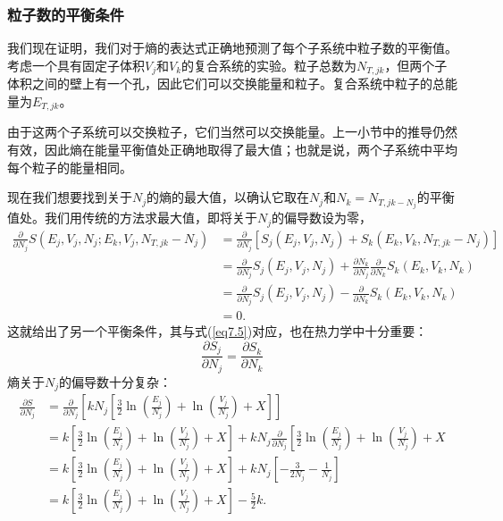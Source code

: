 \documentclass[UTF8]{ctexart}
\numberwithin{equation}{section}%
\numberwithin{figure}{section}%
\begin{document}
    \subsubsection{粒子数的平衡条件}

    我们现在证明，我们对于熵的表达式正确地预测了每个子系统中粒子数的平衡值。考虑一个具有固定子体积$V_j$和$V_k$的复合系统的实验。粒子总数为$N_{T,jk}$，但两个子体积之间的壁上有一个孔，因此它们可以交换能量和粒子。复合系统中粒子的总能量为$E_{T,jk}$。

    由于这两个子系统可以交换粒子，它们当然可以交换能量。上一小节中的推导仍然有效，因此熵在能量平衡值处正确地取得了最大值；也就是说，两个子系统中平均每个粒子的能量相同。

    现在我们想要找到关于$N_j$的熵的最大值，以确认它取在$N_j$和$N_k=N_{T,jk-N_j}$的平衡值处。我们用传统的方法求最大值，即将关于$N_j$的偏导数设为零，
    \begin{equation}
        \begin{aligned}
            \frac{\partial}{\partial N_{j}} S\left(E_{j}, V_{j}, N_{j} ; E_{k}, V_{j}, N_{T, j k}-N_{j}\right) &=\frac{\partial}{\partial N_{j}}\left[S_{j}\left(E_{j}, V_{j}, N_{j}\right)+S_{k}\left(E_{k}, V_{k}, N_{T, j k}-N_{j}\right)\right] \\
            &=\frac{\partial}{\partial N_{j}} S_{j}\left(E_{j}, V_{j}, N_{j}\right)+\frac{\partial N_{k}}{\partial N_{j}} \frac{\partial}{\partial N_{k}} S_{k}\left(E_{k}, V_{k}, N_{k}\right) \\
            &=\frac{\partial}{\partial N_{j}} S_{j}\left(E_{j}, V_{j}, N_{j}\right)-\frac{\partial}{\partial N_{k}} S_{k}\left(E_{k}, V_{k}, N_{k}\right) \\
            &=0 .
            \end{aligned}
    \end{equation}
    这就给出了另一个平衡条件，其与式(\ref{eq7.5})对应，也在热力学中十分重要：
    \begin{equation}
        \frac{\partial S_{j}}{\partial N_{j}}=\frac{\partial S_{k}}{\partial N_{k}}
    \end{equation}
    熵关于$N_j$的偏导数十分复杂：
    \begin{equation}
        \begin{aligned}
            \frac{\partial S}{\partial N_{j}} &=\frac{\partial}{\partial N_{j}}\left[k N_{j}\left[\frac{3}{2} \ln \left(\frac{E_{j}}{N_{j}}\right)+\ln \left(\frac{V_{j}}{N_{j}}\right)+X\right]\right] \\
            &=k\left[\frac{3}{2} \ln \left(\frac{E_{j}}{N_{j}}\right)+\ln \left(\frac{V_{j}}{N_{j}}\right)+X\right]+k N_{j} \frac{\partial}{\partial N_{j}}\left[\frac{3}{2} \ln \left(\frac{E_{j}}{N_{j}}\right)+\ln \left(\frac{V_{j}}{N_{j}}\right)+X\right.\\
            &=k\left[\frac{3}{2} \ln \left(\frac{E_{j}}{N_{j}}\right)+\ln \left(\frac{V_{j}}{N_{j}}\right)+X\right]+k N_{j}\left[-\frac{3}{2 N_{j}}-\frac{1}{N_{j}}\right] \\
            &=k\left[\frac{3}{2} \ln \left(\frac{E_{j}}{N_{j}}\right)+\ln \left(\frac{V_{j}}{N_{j}}\right)+X\right]-\frac{5}{2} k .
            \end{aligned}
    \end{equation}
\end{document}

